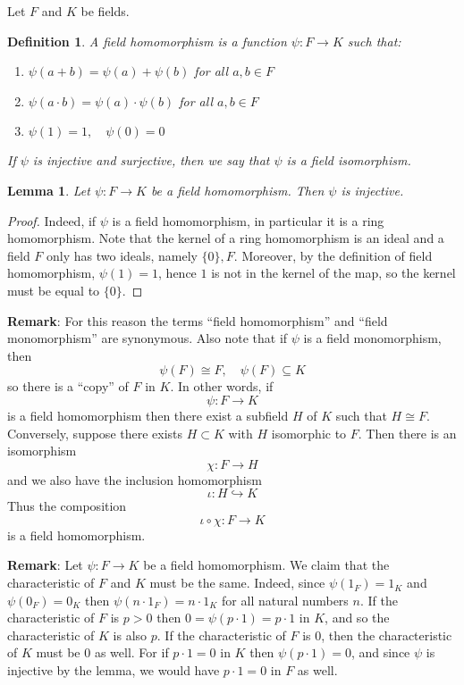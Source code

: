 \documentclass[12pt]{article}
\newtheorem*{defn}{Definition}
\newtheorem*{lemma}{Lemma}
\begin{document}
Let $F$ and $K$ be fields. 
\begin{defn}
A {\em field homomorphism} is a function $\psi\colon F \to K$ such that:
\begin{enumerate}
\item $\psi(a+b) = \psi(a)+\psi(b)$ for all $a,b \in F$
\item $\psi(a\cdot b) = \psi(a) \cdot \psi(b)$ for all $a,b \in F$
\item $\psi(1)=1,\quad \psi(0)=0$
\end{enumerate}
If $\psi$ is injective and surjective, then we say that $\psi$ is a \emph{field isomorphism}.
\end{defn}

\begin{lemma}
Let $\psi\colon F\to K$ be a field homomorphism. Then $\psi$ is
injective.
\end{lemma}
\begin{proof}
Indeed, if $\psi$ is a field homomorphism, in particular it is a
ring homomorphism. Note that the kernel of a ring homomorphism is
an ideal and a field $F$ only has two ideals, namely $\{0\}, F$.
Moreover, by the definition of field homomorphism, $\psi(1)=1$,
hence $1$ is not in the kernel of the map, so the kernel must be
equal to $\{0\}$.
\end{proof}


{\bf Remark}: For this reason the terms ``field homomorphism'' and
``field monomorphism'' are synonymous. Also note that if $\psi$ is
a field monomorphism, then
$$\psi(F)\cong F, \quad \psi(F)\subseteq K$$
so there is a ``copy'' of $F$ in $K$. In other words, if
$$\psi\colon F\to K$$ is a field homomorphism then there exist a
subfield $H$ of $K$ such that $H\cong F$. Conversely, suppose
there exists $H\subset K$ with $H$ isomorphic to $F$. Then there
is an isomorphism $$\chi \colon F \to H$$ and we also have the
inclusion homomorphism $$\iota\colon H \hookrightarrow K$$ Thus
the composition
$$\iota \circ \chi\colon F \to K$$
is a field homomorphism.

{\bf Remark}: Let $\psi : F \to K$ be a field homomorphism. We claim that the characteristic of $F$ and $K$ must be the same. Indeed, since $\psi(1_F)=1_K$ and $\psi(0_F)=0_K$ then $\psi(n\cdot 1_F)=n\cdot 1_K$ for all natural numbers $n$. If the characteristic of $F$ is $p>0$ then $0=\psi(p\cdot 1)=p\cdot 1$ in $K$, and so the characteristic of $K$ is also $p$. If the characteristic of $F$ is $0$, then the characteristic of $K$ must be $0$ as well. For if $p\cdot 1=0$ in $K$ then $\psi(p\cdot 1)=0$, and since $\psi$ is injective by the lemma, we would have $p\cdot 1=0$ in $F$ as well.
\end{document}
